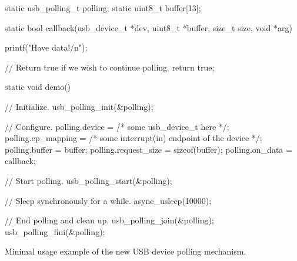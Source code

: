 \begin{listing}
	\begin{code}
		static usb_polling_t polling;
		static uint8_t buffer[13];

		static bool callback(usb_device_t *dev, uint8_t *buffer, size_t size, void *arg)
		{
			printf("Have data!/n");

			// Return true if we wish to continue polling.
			return true;
		}

		static void demo()
		{
			// Initialize.
			usb_polling_init(&polling);

			// Configure.
			polling.device = /* some usb_device_t here */;
			polling.ep_mapping = /* some interrupt(in) endpoint of the device */;
			polling.buffer = buffer;
			polling.request_size = sizeof(buffer);
			polling.on_data = callback;

			// Start polling.
			usb_polling_start(&polling);

			// Sleep synchronously for a while.
			async_usleep(10000);

			// End polling and clean up.
			usb_polling_join(&polling);
			usb_polling_fini(&polling);
		}
	\end{code}
	\caption{Minimal usage example of the new USB device polling mechanism.}
	\label{lst:polling-example}
\end{listing}

